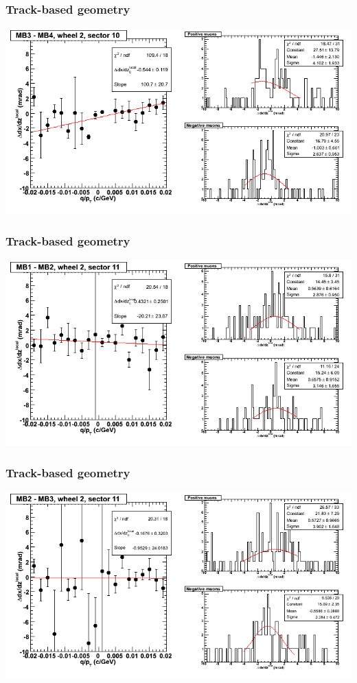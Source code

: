 \documentclass[compress]{beamer}
\begin{document}
\begin{frame}
\frametitle{Track-based geometry}
\includegraphics[width=\linewidth]{NOV4_segdiffs/dt13_slope_E_10_34.png}
\end{frame}

\begin{frame}
\frametitle{Track-based geometry}
\includegraphics[width=\linewidth]{NOV4_segdiffs/dt13_slope_E_11_12.png}
\end{frame}

\begin{frame}
\frametitle{Track-based geometry}
\includegraphics[width=\linewidth]{NOV4_segdiffs/dt13_slope_E_11_23.png}
\end{frame}
\end{document}
